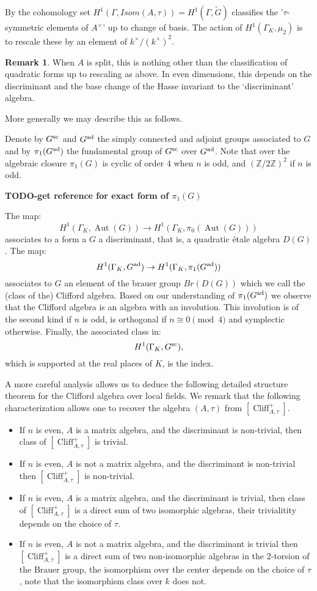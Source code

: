 \documentclass{article}
\theoremstyle{plain}
\theoremstyle{definition}
\newtheorem{remark}[theorem]{Remark}
\numberwithin{equation}{section}
\DeclareMathOperator{\Aut}{Aut}
\DeclareMathOperator{\Clif}{Cliff}
\newcommand{\ZZ}{\mathbb{Z}}
\newcommand{\GalKbK}{\Gamma_K}
\newcommand{\TODO}[1]{\textbf{TODO-#1}}
\begin{document}
By \cite[29.16]{TODO - The book of involutions}
the cohomology set $H^1(\Gamma, Isom(A,\tau)) = H^1(\Gamma,\tilde{G}) $ classifies the '$\tau$-symmetric elements of $A^\times$' up to change of basis.
The action of $H^1(\GalKbK,\mu_2) $ is to rescale these by an element of $k^\times/(k^\times)^2$.
\begin{remark}
When $A$ is split, this is nothing other than the classification of quadratic forms up to rescaling as above.
In even dimensions, this depends on the discriminant and the base change of the Hasse invariant to the `discriminant' algebra.

More generally we may describe this as follows.

Denote by $G^{\rm sc}$ and $G^{\rm ad}$ the simply connected and adjoint groups associated to $G$ and by $\pi_1(G^{\rm ad})$ the fundamental group of $G^{\rm sc}$ over $G^{\rm ad}$. Note that over the algebraic closure $\pi_1(G)$ is cyclic of order $4$ when $n$ is odd, and $(\ZZ/2\ZZ)^2$ if $n$ is odd.

\TODO{get reference for exact form of $\pi_1(G)$}

The map:
\[ H^1(\GalKbK, \Aut(G)) \rightarrow H^1(\GalKbK, \pi_0(\Aut(G))) \]
associates to a form a $G$ a discriminant, that is, a quadratic \'etale algebra $D(G)$.
The map:
\[ H^1(\GalKbK, G^{\rm ad}) \rightarrow H^1(\GalKbK, \pi_1(G^{\rm ad})) \]
associates to $G$ an element of the brauer group $Br(D(G))$ which we call the (class of the) Clifford algebra.
Based on our understanding of $ \pi_1(G^{\rm ad})$ we observe that the Clifford algebra is an algebra with an involution. 
This involution is of the second kind if $n$ is odd, is orthogonal if $n \cong 0 \pmod{4}$ and symplectic otherwise.
Finally, the associated class in:
\[  H^1(\GalKbK, G^{\rm sc}),  \]
which is supported at the real places of $K$, is the index.

A more careful analysis allows us to deduce the following detailed structure theorem for the Clifford algebra over local fields.
We remark that the following characterization allows one to recover the algebra $(A,\tau)$ from $[\Clif^+_{A,\tau}]$.
\begin{itemize}
\item If $n$ is even, $A$ is a matrix algebra, and the discriminant is non-trivial, then class of $[\Clif^+_{A,\tau}]$ is trivial.
\item If $n$ is even, $A$ is not a matrix algebra, and the discriminant is non-trivial then $[\Clif^+_{A,\tau}]$ is non-trivial.
\item If $n$ is even, $A$ is a matrix algebra, and the discriminant is trivial, then class of $[\Clif^+_{A,\tau}]$ is a direct sum of two isomorphic algebras, their trivialitity depends on the choice of $\tau$.
\item If $n$ is even, $A$ is not a matrix algebra, and the discriminant is trivial then $[\Clif^+_{A,\tau}]$ is a direct sum of two non-isomorphic algebras in the $2$-torsion of the Brauer group, the isomorphism over the center depends on the choice of $\tau$, note that the isomorphism class over $k$ does not.


\end{itemize}
\end{remark}
\end{document}
